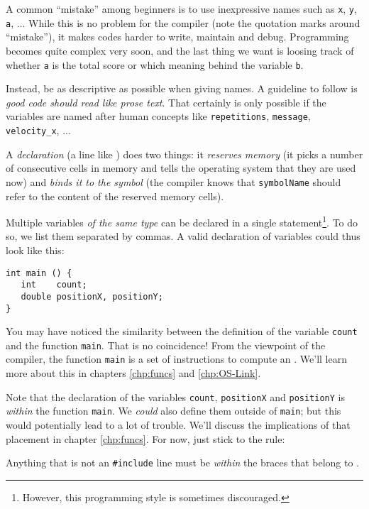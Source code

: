 \begin{hintbox}
A common \enquote{mistake} among beginners is to use inexpressive names such as \texttt{x}, \texttt{y}, \texttt{a}, ... While this is no problem for the compiler (note the quotation marks around \enquote{mistake}), it makes codes harder to write, maintain and debug. Programming becomes quite complex very soon, and the last thing we want is loosing track of whether \texttt{a} is the total score or which meaning behind the variable \texttt{b}.

Instead, be as descriptive as possible when giving names. A guideline to follow is \emph{good code should read like prose text}. That certainly is only possible if the variables are named after human concepts like \texttt{repetitions}, \texttt{message}, \texttt{velocity\_x}, ...
\end{hintbox}

A \emph{declaration} (\ie a line like ) does two things: it \emph{reserves memory} (\ie it picks a number of consecutive cells in memory and tells the operating system that they are used now) and \emph{binds it to the symbol} (\ie the compiler knows that \texttt{symbolName} should refer to the content of the reserved memory cells).

Multiple variables \emph{of the same type} can be declared in a single statement\footnote{However, this programming style is sometimes discouraged.}. To do so, we list them separated by commas. A valid declaration of variables could thus look like this:
\begin{codebox}[declarations.c]
\begin{verbatim}
int main () {
   int    count;
   double positionX, positionY;
}
\end{verbatim}
 \label{code:declaringVars}
\end{codebox}

You may have noticed the similarity between the definition of the variable \texttt{count} and the function \texttt{main}. That is no coincidence! From the viewpoint of the compiler, the function \texttt{main} is a set of instructions to compute an . We'll learn more about this in chapters \ref{chp:funcs} and \ref{chp:OS-Link}.

\begin{warnbox}
Note that the declaration of the variables \texttt{count}, \texttt{positionX} and \texttt{positionY} is \emph{within} the function \texttt{main}. We \emph{could} also define them outside of \texttt{main}; but this would potentially lead to a lot of trouble. We'll discuss the implications of that placement in chapter \ref{chp:funcs}. For now, just stick to the rule:

Anything that is not an \texttt{\#include} line must be \emph{within} the braces that belong to .
\end{warnbox}

